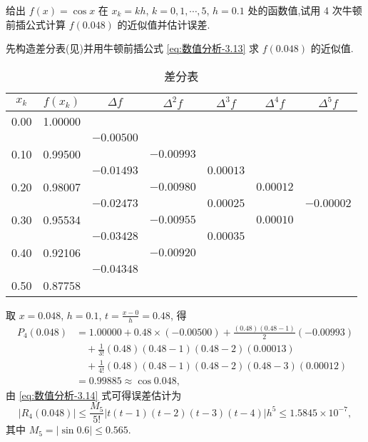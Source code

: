 \documentclass[../../main.tex]{subfiles}
\begin{document}
\begin{example}
给出 $f(x) = \cos x$ 在 $x_k = kh$, $k = 0, 1, \cdots, 5$, $h = 0.1$ 处的函数值,试用 4 次牛顿前插公式计算 $f(0.048)$ 的近似值并估计误差.
\end{example}
\begin{solution}
先构造差分表(见)并用牛顿前插公式 \eqref{eq:数值分析-3.13} 求 $f(0.048)$ 的近似值.
\begin{table}[H]
\centering
\caption{差分表}
\label{tab:difference-table12312344343452345634456}
\begin{tabular}{c c c c c c c}
\toprule
$x_k$ & $f(x_k)$ & $\Delta f$ & $\Delta^2 f$ & $\Delta^3 f$ & $\Delta^4 f$ & $\Delta^5 f$ \\
\midrule
0.00 & 1.00000 &  &  &  &  &  \\
&  & $-0.00500$ &  &  &  &  \\
0.10 & 0.99500 &  & $-0.00993$ &  &  &  \\
&  & $-0.01493$ &  & $0.00013$ &  &  \\
0.20 & 0.98007 &  & $-0.00980$ &  & $0.00012$ &  \\
&  & $-0.02473$ &  & $0.00025$ &  & $-0.00002$ \\
0.30 & 0.95534 &  & $-0.00955$ &  & $0.00010$ &  \\
&  & $-0.03428$ &  & $0.00035$ &  &  \\
0.40 & 0.92106 &  & $-0.00920$ &  &  &  \\
&  & $-0.04348$ &  &  &  &  \\
0.50 & 0.87758 &  &  &  &  &  \\
\bottomrule
\end{tabular}
\end{table}
取 $x = 0.048$, $h = 0.1$, $t = \frac{x - 0}{h} = 0.48$, 得
\begin{align*}
P_4(0.048) &= 1.00000 + 0.48 \times (-0.00500) + \frac{(0.48)(0.48 - 1)}{2}(-0.00993) \\
&\quad + \frac{1}{3!}(0.48)(0.48 - 1)(0.48 - 2)(0.00013) \\
&\quad + \frac{1}{4!}(0.48)(0.48 - 1)(0.48 - 2)(0.48 - 3)(0.00012) \\
&= 0.99885 \approx \cos 0.048,
\end{align*}
由 \eqref{eq:数值分析-3.14} 式可得误差估计为
\[
|R_4(0.048)| \leqslant \frac{M_5}{5!} | t(t - 1)(t - 2)(t - 3)(t - 4) | h^5 \leqslant 1.5845 \times 10^{-7},
\]
其中 $M_5 = |\sin 0.6| \leqslant 0.565$.

\end{solution}
\end{document}
